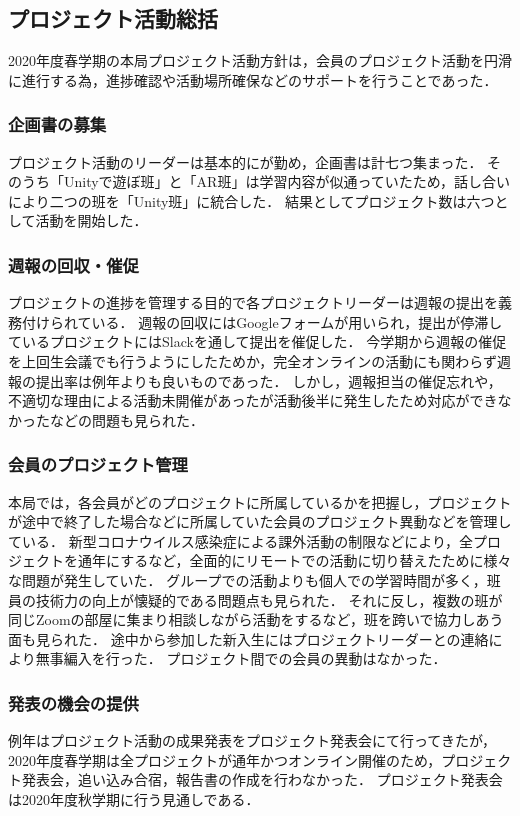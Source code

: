 \subsection*{プロジェクト活動総括}


2020年度春学期の本局プロジェクト活動方針は，会員のプロジェクト活動を円滑に進行する為，進捗確認や活動場所確保などのサポートを行うことであった．

\subsubsection*{企画書の募集}

プロジェクト活動のリーダーは基本的に\secondGrade{}が勤め，企画書は計七つ集まった．
そのうち「Unityで遊ぼ班」と「AR班」は学習内容が似通っていたため，話し合いにより二つの班を「Unity班」に統合した．
結果としてプロジェクト数は六つとして活動を開始した．

\subsubsection*{週報の回収・催促}

プロジェクトの進捗を管理する目的で各プロジェクトリーダーは週報の提出を義務付けられている．
週報の回収にはGoogleフォームが用いられ，提出が停滞しているプロジェクトにはSlackを通して提出を催促した．
今学期から週報の催促を上回生会議でも行うようにしたためか，完全オンラインの活動にも関わらず週報の提出率は例年よりも良いものであった．
しかし，週報担当の催促忘れや，不適切な理由による活動未開催があったが活動後半に発生したため対応ができなかったなどの問題も見られた．

\subsubsection*{会員のプロジェクト管理}

本局では，各会員がどのプロジェクトに所属しているかを把握し，プロジェクトが途中で終了した場合などに所属していた会員のプロジェクト異動などを管理している．
新型コロナウイルス感染症による課外活動の制限などにより，全プロジェクトを通年にするなど，全面的にリモートでの活動に切り替えたために様々な問題が発生していた．
グループでの活動よりも個人での学習時間が多く，班員の技術力の向上が懐疑的である問題点も見られた．
それに反し，複数の班が同じZoomの部屋に集まり相談しながら活動をするなど，班を跨いで協力しあう面も見られた．
途中から参加した新入生にはプロジェクトリーダーとの連絡により無事編入を行った．
プロジェクト間での会員の異動はなかった．

\subsubsection*{発表の機会の提供}

例年はプロジェクト活動の成果発表をプロジェクト発表会にて行ってきたが，2020年度春学期は全プロジェクトが通年かつオンライン開催のため，プロジェクト発表会，追い込み合宿，報告書の作成を行わなかった．
プロジェクト発表会は2020年度秋学期に行う見通しである．
